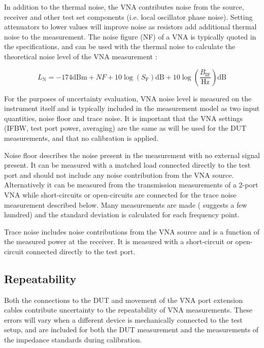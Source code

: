 \documentclass[../thesis/thesis.tex]{subfiles}
\begin{document}
In addition to the thermal noise, the VNA contributes noise from the source, receiver and other test set components (i.e. local oscillator phase noise). Setting attenuators to lower values will improve noise as resistors add additional thermal noise to the measurement. The noise figure (NF) of a VNA is typically quoted in the specifications, and can be used with the thermal noise to calculate the theoretical noise level of the VNA measurement \cite{Hiebel_2008}:

\begin{equation}
	L_\textrm{N} = -174 \textrm{dBm} + NF + 10\log(S_\textrm{F})\textrm{dB} + 10\log\left(\frac{B_\textrm{IF}}{\textrm{Hz}}\right)\textrm{dB}
\end{equation}

For the purposes of uncertainty evaluation, VNA noise level is measured on the instrument itself and is typically included in the measurement model as two input quantities, noise floor and trace noise. It is important that the VNA settings (IFBW, test port power, averaging) are the same as will be used for the DUT measurements, and that no calibration is applied.

Noise floor describes the noise present in the measurement with no external signal present. It can be measured with a matched load connected directly to the test port and should not include any noise contribution from the VNA source. Alternatively it can be measured from the transmission measurements of a 2-port VNA while short-circuits or open-circuits are connected for the trace noise measurement described below. Many measurements are made (\cite{EURAMET_2011} suggests a few hundred) and the standard deviation is calculated for each frequency point.

Trace noise includes noise contributions from the VNA source and is a function of the measured power at the receiver. It is measured with a short-circuit or open-circuit connected directly to the test port.

\subsection{Repeatability}

Both the connections to the DUT and movement of the VNA port extension cables contribute uncertainty to the repeatability of VNA measurements. These errors will vary when a different device is mechanically connected to the test setup, and are included for both the DUT measurement and the measurements of the impedance standards during calibration.
\end{document}
